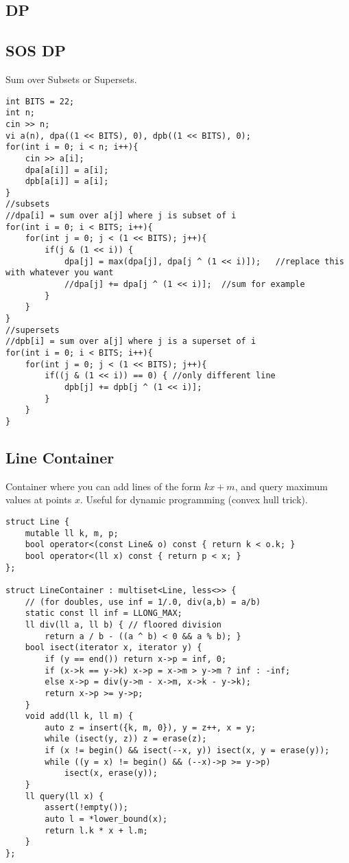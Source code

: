 \documentclass[8pt, headheight=10pt, a4paper]{article}
\begin{document}
\begin{multicols*}{3}
\section{DP}
\subsection{SOS DP}
Sum over Subsets or Supersets.
\begin{lstlisting}
int BITS = 22;
int n;
cin >> n;
vi a(n), dpa((1 << BITS), 0), dpb((1 << BITS), 0);
for(int i = 0; i < n; i++){
    cin >> a[i];
    dpa[a[i]] = a[i];
    dpb[a[i]] = a[i];
}
//subsets
//dpa[i] = sum over a[j] where j is subset of i
for(int i = 0; i < BITS; i++){
    for(int j = 0; j < (1 << BITS); j++){
        if(j & (1 << i)) {
            dpa[j] = max(dpa[j], dpa[j ^ (1 << i)]);   //replace this with whatever you want
            //dpa[j] += dpa[j ^ (1 << i)];  //sum for example
        }
    }
}
//supersets
//dpb[i] = sum over a[j] where j is a superset of i
for(int i = 0; i < BITS; i++){
    for(int j = 0; j < (1 << BITS); j++){
        if((j & (1 << i)) == 0) { //only different line
            dpb[j] += dpb[j ^ (1 << i)];
        }
    }
}
\end{lstlisting}

\subsection{Line Container}
Container where you can add lines of the form $kx + m$, and query maximum values at points $x$. Useful for dynamic programming (convex hull trick). 
\begin{lstlisting}
struct Line {
	mutable ll k, m, p;
	bool operator<(const Line& o) const { return k < o.k; }
	bool operator<(ll x) const { return p < x; }
};

struct LineContainer : multiset<Line, less<>> {
	// (for doubles, use inf = 1/.0, div(a,b) = a/b)
	static const ll inf = LLONG_MAX;
	ll div(ll a, ll b) { // floored division
		return a / b - ((a ^ b) < 0 && a % b); }
	bool isect(iterator x, iterator y) {
		if (y == end()) return x->p = inf, 0;
		if (x->k == y->k) x->p = x->m > y->m ? inf : -inf;
		else x->p = div(y->m - x->m, x->k - y->k);
		return x->p >= y->p;
	}
	void add(ll k, ll m) {
		auto z = insert({k, m, 0}), y = z++, x = y;
		while (isect(y, z)) z = erase(z);
		if (x != begin() && isect(--x, y)) isect(x, y = erase(y));
		while ((y = x) != begin() && (--x)->p >= y->p)
			isect(x, erase(y));
	}
	ll query(ll x) {
		assert(!empty());
		auto l = *lower_bound(x);
		return l.k * x + l.m;
	}
};
\end{lstlisting}


\end{multicols*}
\end{document}
